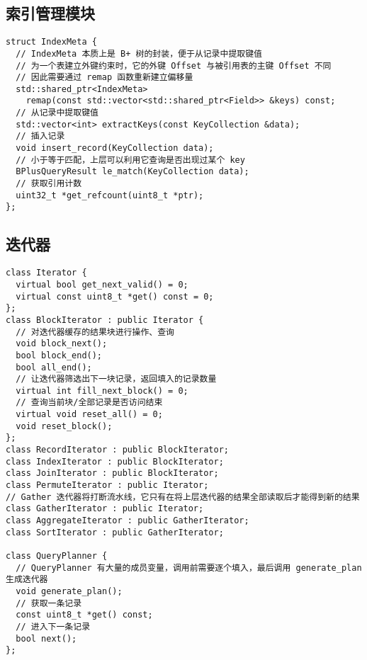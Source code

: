 \documentclass{ctexart}
\begin{document}
\subsection{索引管理模块}
\begin{mdframed}
	\begin{verbatim}
struct IndexMeta {
  // IndexMeta 本质上是 B+ 树的封装，便于从记录中提取键值
  // 为一个表建立外键约束时，它的外键 Offset 与被引用表的主键 Offset 不同
  // 因此需要通过 remap 函数重新建立偏移量
  std::shared_ptr<IndexMeta>
    remap(const std::vector<std::shared_ptr<Field>> &keys) const;
  // 从记录中提取键值
  std::vector<int> extractKeys(const KeyCollection &data);
  // 插入记录
  void insert_record(KeyCollection data);
  // 小于等于匹配，上层可以利用它查询是否出现过某个 key
  BPlusQueryResult le_match(KeyCollection data);
  // 获取引用计数
  uint32_t *get_refcount(uint8_t *ptr);
};
\end{verbatim}
\end{mdframed}

\subsection{迭代器}
\begin{mdframed}
	\begin{verbatim}
class Iterator {
  virtual bool get_next_valid() = 0;
  virtual const uint8_t *get() const = 0;
};
class BlockIterator : public Iterator {
  // 对迭代器缓存的结果块进行操作、查询
  void block_next();
  bool block_end();
  bool all_end();
  // 让迭代器筛选出下一块记录，返回填入的记录数量
  virtual int fill_next_block() = 0;
  // 查询当前块/全部记录是否访问结束
  virtual void reset_all() = 0;
  void reset_block();
};
class RecordIterator : public BlockIterator;
class IndexIterator : public BlockIterator;
class JoinIterator : public BlockIterator;
class PermuteIterator : public Iterator;
// Gather 迭代器将打断流水线，它只有在将上层迭代器的结果全部读取后才能得到新的结果
class GatherIterator : public Iterator;
class AggregateIterator : public GatherIterator;
class SortIterator : public GatherIterator;

class QueryPlanner {
  // QueryPlanner 有大量的成员变量，调用前需要逐个填入，最后调用 generate_plan 生成迭代器
  void generate_plan();
  // 获取一条记录
  const uint8_t *get() const;
  // 进入下一条记录
  bool next();
};
\end{verbatim}
\end{mdframed}
\end{document}
